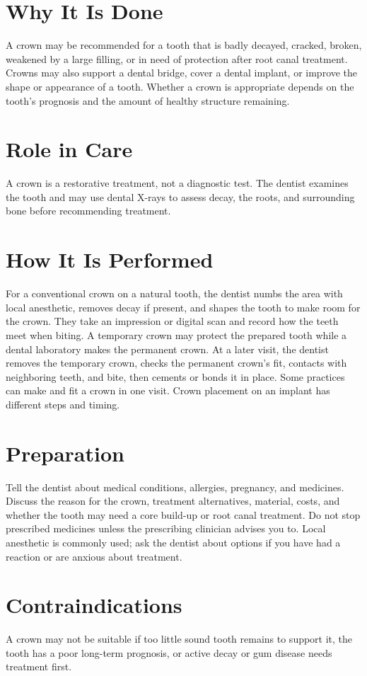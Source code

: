 \section*{Why It Is Done}
A crown may be recommended for a tooth that is badly decayed, cracked, broken, weakened by a large filling, or in need of protection after root canal treatment. Crowns may also support a dental bridge, cover a dental implant, or improve the shape or appearance of a tooth. Whether a crown is appropriate depends on the tooth's prognosis and the amount of healthy structure remaining.

\section*{Role in Care}
A crown is a restorative treatment, not a diagnostic test. The dentist examines the tooth and may use dental X-rays to assess decay, the roots, and surrounding bone before recommending treatment.

\section*{How It Is Performed}
For a conventional crown on a natural tooth, the dentist numbs the area with local anesthetic, removes decay if present, and shapes the tooth to make room for the crown. They take an impression or digital scan and record how the teeth meet when biting. A temporary crown may protect the prepared tooth while a dental laboratory makes the permanent crown. At a later visit, the dentist removes the temporary crown, checks the permanent crown's fit, contacts with neighboring teeth, and bite, then cements or bonds it in place. Some practices can make and fit a crown in one visit. Crown placement on an implant has different steps and timing.

\section*{Preparation}
Tell the dentist about medical conditions, allergies, pregnancy, and medicines. Discuss the reason for the crown, treatment alternatives, material, costs, and whether the tooth may need a core build-up or root canal treatment. Do not stop prescribed medicines unless the prescribing clinician advises you to. Local anesthetic is commonly used; ask the dentist about options if you have had a reaction or are anxious about treatment.

\section*{Contraindications}
A crown may not be suitable if too little sound tooth remains to support it, the tooth has a poor long-term prognosis, or active decay or gum disease needs treatment first.

